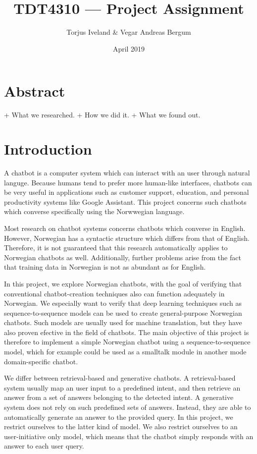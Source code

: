 \documentclass{article}
\title{TDT4310 --- Project Assignment}
\author{Torjus Iveland \& Vegar Andreas Bergum}
\date{April 2019}
\begin{document}
\maketitle

\section{Abstract}

+ What we researched.
+ How we did it.
+ What we found out.

\section{Introduction}

A chatbot is a computer system which can interact with an user through natural languge. Because
humans tend to prefer more human-like interfaces, chatbots can be very useful in applications
such as customer support, education, and personal productivity systems like Google Assistant.
This project concerns such chatbots which converse specifically using the Norwwegian language.

Most research on chatbot systems concerns chatbots which converse in English. However, Norwegian
has a syntactic structure which differs from that of English. Therefore, it is not guaranteed that
this research automatically applies to Norwegian chatbots as well. Additionally, further problems
arise from the fact that training data in Norwegian is not as abundant as for English.

In this project, we explore Norwegian chatbots, with the goal of verifying that conventional
chatbot-creation techniques also can function adequately in Norwegian. We especially want to
verify that deep learning techniques such as sequence-to-sequence models \cite{Cho2014} can be
used to create general-purpose Norwegian chatbots. Such models are usually used for machine
translation, but they have also proven efective in the field of chatbots. The main objective
of this project is therefore to implement a simple Norwegian chatbot using a sequence-to-sequence
model, which for example could be used as a smalltalk module in another mode domain-specific chatbot.

We differ between retrieval-based and generative chatbots. A retrieval-based system usually map
an user input to a predefined intent, and then retrieve an answer from a set of answers belonging
to the detected intent. A generative system does not rely on such predefined sets of answers.
Instead, they are able to automatically generate an answer to the provided query. In this project,
we restrict ourselves to the latter kind of model. We also restrict ourselves to an user-initiative
only model, which means that the chatbot simply responds with an answer to each user query.
\end{document}
